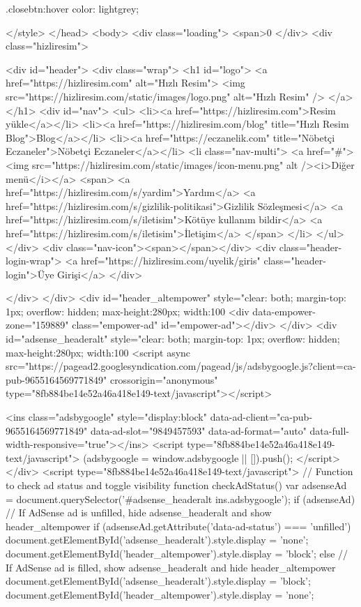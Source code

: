 .closebtn:hover {
  color: lightgrey;
}

	</style>
</head>
<body>
<div class="loading">
<span>0%
</div>
<div class="hizliresim">

<div id="header">
<div class="wrap">
<h1 id="logo">
<a href="https://hizliresim.com" alt="Hızlı Resim">
<img src="https://hizliresim.com/static/images/logo.png" alt="Hızlı Resim" />
</a>
</h1>
<div id="nav">
<ul>
<li><a href="https://hizliresim.com">Resim yükle</a></li>
<li><a href="https://hizliresim.com/blog" title="Hızlı Resim Blog">Blog</a></li>
<li><a href="https://eczanelik.com" title="Nöbetçi Eczaneler">Nöbetçi Eczaneler</a></li>
<li class="nav-multi">
<a href="#"><img src="https://hizliresim.com/static/images/icon-menu.png" alt /><i>Diğer menü</i></a>
<span>
<a href="https://hizliresim.com/s/yardim">Yardım</a>
<a href="https://hizliresim.com/s/gizlilik-politikasi">Gizlilik Sözleşmesi</a>
<a href="https://hizliresim.com/s/iletisim">Kötüye kullanım bildir</a>
<a href="https://hizliresim.com/s/iletisim">İletişim</a>
</span>
</li>
</ul>
</div>
<div class="nav-icon"><span></span></div>
<div class="header-login-wrap">
<a href="https://hizliresim.com/uyelik/giris" class="header-login">Üye Girişi</a>
</div>

</div>
</div>
<div id="header_altempower" style="clear: both; margin-top: 1px; overflow: hidden; max-height:280px; width:100%
<div data-empower-zone="159889" class="empower-ad" id="empower-ad"></div>
</div>
<div id="adsense_headeralt" style="clear: both; margin-top: 1px; overflow: hidden; max-height:280px; width:100%
<script async src="https://pagead2.googlesyndication.com/pagead/js/adsbygoogle.js?client=ca-pub-9655164569771849" crossorigin="anonymous" type="8fb884be14e52a46a418e149-text/javascript"></script>

<ins class="adsbygoogle" style="display:block" data-ad-client="ca-pub-9655164569771849" data-ad-slot="9849457593" data-ad-format="auto" data-full-width-responsive="true"></ins>
<script type="8fb884be14e52a46a418e149-text/javascript">
        (adsbygoogle = window.adsbygoogle || []).push({});
    </script>
</div>
<script type="8fb884be14e52a46a418e149-text/javascript">
    // Function to check ad status and toggle visibility
    function checkAdStatus() {
        var adsenseAd = document.querySelector('#adsense_headeralt ins.adsbygoogle');
        if (adsenseAd) {
            // If AdSense ad is unfilled, hide adsense_headeralt and show header_altempower
            if (adsenseAd.getAttribute('data-ad-status') === 'unfilled') {
                document.getElementById('adsense_headeralt').style.display = 'none';
                document.getElementById('header_altempower').style.display = 'block';
            } else {
                // If AdSense ad is filled, show adsense_headeralt and hide header_altempower
                document.getElementById('adsense_headeralt').style.display = 'block';
                document.getElementById('header_altempower').style.display = 'none';
            }
        }
    }

